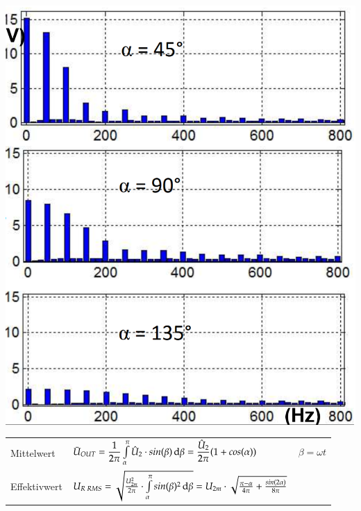 \begin{minipage}{0.25\linewidth}
    \includegraphics[width=0.8\linewidth]{images/M1COW} 
\end{minipage}
\newline
\vspace{-0.8cm}
\begin{longtable}{ p{}  p{}  p{} } %
    Mittelwert&
    $ \bar{U}_{OUT} = \dfrac{1}{2\pi} \int\limits_{\alpha}^{\pi}\hat{U}_2\cdot sin(\beta) \mathop{}\!\mathrm{d} \beta =\dfrac{\hat{U}_2}{2\pi}(1+cos(\alpha)) $&
    \[ \beta = \omega t\]
    \\[-1cm]
    Effektivwert&
    $ U_{R\; RMS}= \sqrt{\frac{U_{2m}^2}{2\pi}\cdot \int\limits_{\alpha}^{\pi} sin(\beta)^2 \mathop{}\!\mathrm{d} \beta}
    = U_{2m}\cdot \sqrt{\frac{\pi - \alpha}{4 \pi}+ \frac{sin(2\alpha)}{8\pi}}$&
    \\
\end{longtable}
\vspace{-0.5cm}


